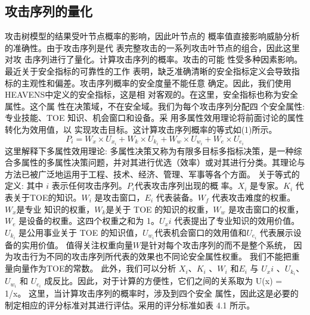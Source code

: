 \subsection{攻击序列的量化}
攻击树模型的结果受叶节点概率的影响，因此叶节点的
概率值直接影响威胁分析的准确性。由于攻击序列是代
表完整攻击的一系列攻击叶节点的组合，因此这里对攻
击序列进行了量化。计算攻击序列的概率。攻击的可能
性受多种因素影响。最近关于安全指标的可靠性的工作
\cite{samuel2020evaluating}表明，缺乏准确清晰的安全指标定义会导致指
标的主观性和偏差。攻击序列概率的安全度量不能任意
确定。因此，我们使用HEAVENS中定义的安全指标，这是相
对客观的。在这里，安全指标也称为安全属性。这个属
性在决策域，不在安全域。我们为每个攻击序列分配四
个安全属性:专业技能、TOE 知识、机会窗口和设备。采
用多属性效用理论将前面讨论的属性转化为效用值，以
实现攻击目标。这计算攻击序列概率的等式如(1)所示。
\begin{equation}
    P_i=W_x \times U_{x_i}+W_k \times U_{k_i}+W_w \times U_{w_i}+W_e \times U_{e_i}
    \end{equation}
\newline
这里解释下多属性效用理论\cite{winterfeldt1975multi}: 多属性决策又称为有限多目标多指标决策，是一种综合多属性的多属性决策问题，并对其进行优选（效率）或对其进行分类。其理论与方法已被广泛地运用于工程、技术、经济、管理、军事等各个方面。
\newline
关于等式的定义:
其中 $i$ 表示任何攻击序列。$P_i$代表攻击序列出现的概
率。$X_i$ 是专家。$K_i$ 代表关于TOE的知识。$W_i$ 是攻击窗口，$E_i$ 代表装备。$W_f$ 代表攻击难度的权重。 $W_x$是专业
知识的权重，$W_k$是关于 TOE 的知识的权重，$W_w$ 是攻击窗口的权重，$W_e$ 是设备的权重。这四个权重之和为
1。$U_xi$ 代表提出了专业知识的效用价值。$U_{k_i}$ 是公用事业关于 TOE 的知识值，$U_{w_i}$代表机会窗口的效用值和$U_{e_i}$ 代表展示设备的实用价值。
\newline
值得关注权重向量$W$是针对每个攻击序列的而不是整个系统，
因为攻击行为不同的攻击序列所代表的效果也不同论安全属性权重。
我们不能把重量向量作为TOE的常数。
此外，我们可以分析 $X_i$、$K_i$ 、$W_i$ 和$E_i$ 与 $U_xi$ 、$U_{k_i}$、$U_{w_i}$ 和 $U_{e_i}$ 成反比。因此，对于计算的方便性，它们之间的关系取为 U(x) = 1/x。
这里，当计算攻击序列的概率时，涉及到四个安全
属性，因此这是必要的制定相应的评分标准对其进行评估。采用的评分标准如表 4.1 所示。

